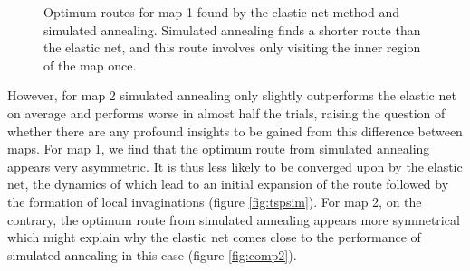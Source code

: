 \documentclass{article}
\begin{document}
\begin{figure}[h]
\begin{subfigure}[t]{0.27\linewidth}
		\label{fig:comp1an}	
	\end{subfigure}%
\caption{Optimum routes for map 1 found by the elastic net method and simulated annealing. Simulated annealing finds a shorter route than the elastic net, and this route involves only visiting the inner region of the map once. }
\label{fig:comp1}
\end{figure}

However, for map 2 simulated annealing only slightly outperforms the elastic net on average and performs worse in almost half the trials, raising the question of whether there are any profound insights to be gained from this difference between maps. For map 1, we find that the optimum route from simulated annealing appears very asymmetric. It is thus less likely to be converged upon by the elastic net, the dynamics of which lead to an initial expansion of the route followed by the formation of local invaginations (figure \ref{fig:tspsim}).
For map 2, on the contrary, the optimum route from simulated annealing appears more symmetrical which might explain why the elastic net comes close to the performance of simulated annealing in this case (figure \ref{fig:comp2}).
\end{document}

